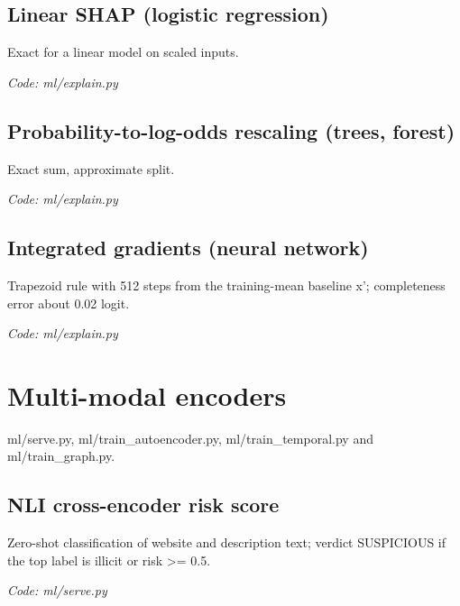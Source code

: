 \documentclass[11pt,a4paper]{article}
\newcommand{\where}[1]{\par{\small\itshape\color{mute}Code: #1}\par}
\begin{document}
\subsection*{Linear SHAP (logistic regression)}
\par\smallskip\noindent{}\par\smallskip
Exact for a linear model on scaled inputs.
\where{ml/explain.py}

\subsection*{Probability-to-log-odds rescaling (trees, forest)}
\par\smallskip\noindent{}\par\smallskip
Exact sum, approximate split.
\where{ml/explain.py}

\subsection*{Integrated gradients (neural network)}
\par\smallskip\noindent{}\par\smallskip
Trapezoid rule with 512 steps from the training-mean baseline x'; completeness error about 0.02 logit.
\where{ml/explain.py}

\clearpage
\section{Multi-modal encoders}
{\color{mute}ml/serve.py, ml/train\_autoencoder.py, ml/train\_temporal.py and ml/train\_graph.py.}

\subsection*{NLI cross-encoder risk score}
\par\smallskip\noindent{}\par\smallskip
Zero-shot classification of website and description text; verdict SUSPICIOUS if the top label is illicit or risk \textgreater{}= 0.5.
\where{ml/serve.py}
\end{document}
